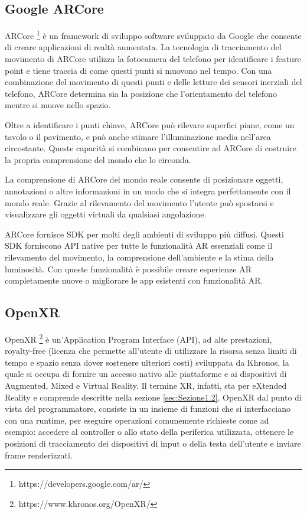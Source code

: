 \subsection{Google ARCore}
ARCore \footnote{https://developers.google.com/ar/} è un framework di sviluppo software sviluppato da Google che consente di creare applicazioni di realtà aumentata.
La tecnologia di tracciamento del movimento di ARCore utilizza la fotocamera del telefono per identificare i feature point e tiene traccia di come questi punti si muovono nel tempo. Con una combinazione del movimento di questi punti e delle letture dei sensori inerziali del telefono, ARCore determina sia la posizione che l'orientamento del telefono mentre si muove nello spazio.

Oltre a identificare i punti chiave, ARCore può rilevare superfici piane, come un tavolo o il pavimento, e può anche stimare l'illuminazione media nell'area circostante. Queste capacità si combinano per consentire ad ARCore di costruire la propria comprensione del mondo che lo circonda.

La comprensione di ARCore del mondo reale consente di posizionare oggetti, annotazioni o altre informazioni in un modo che si integra perfettamente con il mondo reale.
Grazie al rilevamento del movimento l'utente può spostarsi e visualizzare gli oggetti virtuali da qualsiasi angolazione.

ARCore fornisce SDK per molti degli ambienti di sviluppo più diffusi. Questi SDK forniscono API native per tutte le funzionalità AR essenziali come il rilevamento del movimento, la comprensione dell'ambiente e la stima della luminosità. Con queste funzionalità è possibile creare esperienze AR completamente nuove o migliorare le app esistenti con funzionalità AR.

\subsection{OpenXR}
OpenXR \footnote{https://www.khronos.org/OpenXR/} è un’Application Program Interface (API), ad alte prestazioni, royalty-free (licenza che permette all'utente di utilizzare la risorsa senza limiti di tempo e spazio senza dover sostenere ulteriori costi) sviluppata da Khronos, la quale si occupa di fornire un accesso nativo alle piattaforme e ai dispositivi di Augmented, Mixed e Virtual Reality. Il termine XR, infatti, sta per eXtended Reality e comprende descritte nella sezione \ref{sec:Sezione1.2}.
OpenXR dal punto di vista del programmatore, consiste in un insieme di funzioni che si interfacciano con una runtime, per eseguire operazioni comunemente richieste come ad esempio: accedere al controller o allo stato della periferica utilizzata, ottenere le posizioni di tracciamento dei dispositivi di input o della testa dell’utente e inviare frame renderizzati.

